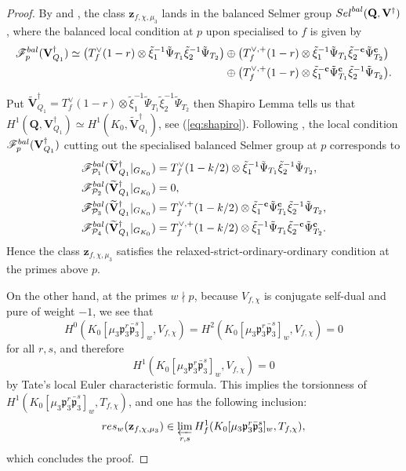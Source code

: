 \documentclass[10pt,letterpaper]{amsart}
\theoremstyle{plain}
\theoremstyle{definition}
\theoremstyle{definition}
\theoremstyle{plain}
\theoremstyle{plain}
\theoremstyle{plain}
\theoremstyle{remark}
\numberwithin{equation}{section}
\newcommand{\cc}{\mathbf{c}}
\newcommand{\ch}{\xi}
\newcommand{\pp}{\mathfrak{p}}
\newcommand{\ppbar}{\bar{\mathfrak{p}}}
\def\cP{{\mathcal P}}
\newcommand{\Vsdag}{{\mathbf{V}_{Q_1}^\dagger}}
\newcommand{\Vdag}{{\mathbf{V}^\dagger}}
\newcommand{\Q}{\mathbf{Q}}
\begin{document}
\begin{proof}
By \cite[Cor.\,8.2]{BSV} and \cite[Sec.\,3.2]{CD}, the class $\mathbf{z}_{f,\chi,\mu_3}$ lands in the balanced Selmer group ${\rm Sel}^{\rm bal}(\Q,\Vdag)$, where the balanced local condition at $p$ upon specialised to $f$ is given by
\begin{equation}\label{eq:bal-def}
\begin{aligned}
\mathscr{F}^{\rm bal}_p(\Vsdag)
\simeq\bigl(T_f^{\vee}(1-r)\otimes\tilde{\ch}_1^{-1}\tilde{\Psi}_{T_1}\tilde{\ch}_2^{-1}\tilde{\Psi}_{T_2}\bigr)&\oplus\bigl(T_f^{\vee,+}(1-r)\otimes\tilde{\ch}_1^{-1}\tilde{\Psi}_{T_1}\tilde{\ch}_2^{-\cc}\tilde{\Psi}_{T_2}^{\cc}\bigr)\\
&\oplus\bigl(T_f^{\vee,+}(1-r)\otimes\tilde{\ch}_1^{-\cc}\tilde{\Psi}_{T_1}^{\cc}\tilde{\ch}_2^{-1}\tilde{\Psi}_{T_2}\bigr).
\end{aligned}
\end{equation}

Put $\widetilde{\mathbf{V}}_{Q_1}^\dagger=T_f^{\vee}(1-r)\otimes\tilde{\ch}_1^{-1}\tilde{\Psi}_{T_1}\tilde{\ch}_2^{-1}\tilde{\Psi}_{T_2}$ then Shapiro Lemma tells us that $H^1(\Q,\Vsdag)\simeq H^1(K_0,\widetilde{\mathbf{V}}_{Q_1}^\dagger)$, see (\ref{eq:shapiro}). Following \cite[Sec.\,5.3]{CD}, the local condition  $\mathscr{F}_p^{\rm bal}(\Vsdag)$ cutting out the specialised balanced Selmer group at $p$ corresponds to
\begin{equation}
\begin{split}
\mathscr{F}_{\cP_1}^{\rm bal}(\widetilde{\mathbf{V}}^\dagger_{Q_1}\vert_{G_{K_0}})&=T_f^\vee(1-k/2)\otimes\tilde{\ch}_1^{-1}\tilde{\Psi}_{T_1}\tilde{\ch}_2^{-1}\tilde{\Psi}_{T_2},\\
\mathscr{F}_{\cP_2}^{\rm bal}(\widetilde{\mathbf{V}}^\dagger_{Q_1}\vert_{G_{K_0}})&=0,\\
\mathscr{F}_{\cP_3}^{\rm bal}(\widetilde{\mathbf{V}}^\dagger_{Q_1}\vert_{G_{K_0}})&=T_f^{\vee,+}(1-k/2)\otimes\tilde{\ch}_1^{-\cc}\tilde{\Psi}_{T_1}^{\cc}\tilde{\ch}_2^{-1}\tilde{\Psi}_{T_2},\\
\mathscr{F}_{\cP_4}^{\rm bal}(\widetilde{\mathbf{V}}^\dagger_{Q_1}\vert_{G_{K_0}})&=T_f^{\vee,+}(1-k/2)\otimes\tilde{\ch}_1^{-1}\tilde{\Psi}_{T_1}\tilde{\ch}_2^{-\cc}\tilde{\Psi}_{T_2}^{\cc}.
\end{split}
\end{equation}
Hence the class $\mathbf{z}_{f,\chi,\mu_3}$ satisfies the relaxed-strict-ordinary-ordinary condition at the primes above $p$. 


On the other hand, at the primes $w\nmid p$, because $V_{f,\chi}$ is conjugate self-dual and pure of weight $-1$, we see that 
\[
H^0(K_0[\mu_3\pp_3^r\ppbar_3^s]_w,V_{f,\chi})=H^2(K_0[\mu_3\pp_3^r\ppbar_3^s]_w,V_{f,\chi})=0
\]
for all $r,s$, and therefore $$H^1(K_0[\mu_3\pp_3^r\ppbar_3^s]_w,V_{f,\chi})=0$$ by Tate's local Euler characteristic formula. This implies the torsionness of  $H^1(K_0[\mu_3\pp_3^r\ppbar_3^s]_w,T_{f,\chi})$, and one has the following inclusion:
\[
{\rm res}_w(\mathbf{z}_{f,\chi,\mu_3})\in \varprojlim_{r,s} H^1_f(K_0[\mu_3\pp_3^r\ppbar_3^s]_w,T_{f,\chi}),
\]
which concludes the proof.
\end{proof}
\end{document}
